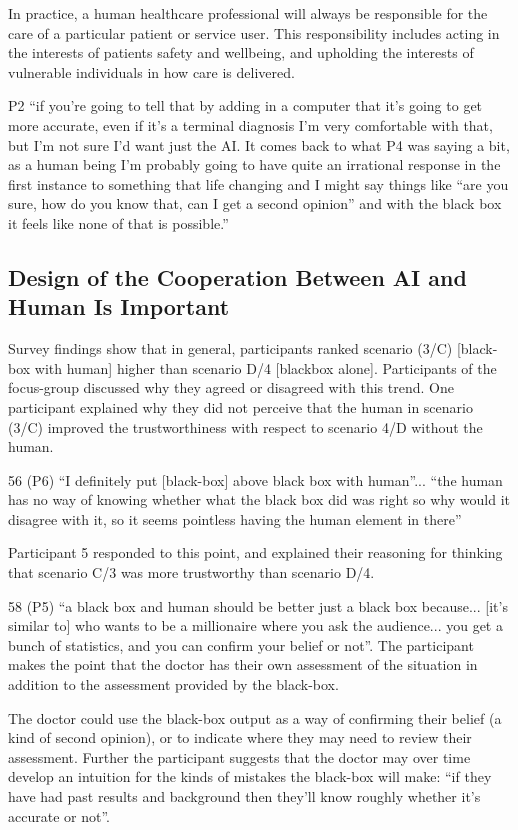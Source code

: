 \documentclass[manuscript,screen,review]{acmart}
\begin{document}
In practice, a human healthcare professional will always be responsible for the care of a particular patient or service user. This responsibility includes acting in the interests of patients safety and wellbeing, and upholding the interests of vulnerable individuals in how care is delivered. 

P2 “if you're going to tell that by adding in a computer that it’s going to get more accurate, even if it’s a terminal diagnosis I'm very comfortable with that, but I'm not sure I'd want just the AI. It comes back to what P4 was saying a bit, as a human being I'm probably going to have quite an irrational response in the first instance to something that life changing and I might say things like “are you sure, how do you know that, can I get a second opinion” and with the black box it feels like none of that is possible.”

\subsection{Design of the Cooperation Between AI and Human Is Important}
Survey findings show that in general, participants ranked scenario (3/C) [black-box with human] higher than scenario D/4 [blackbox alone]. 
Participants of the focus-group discussed why they agreed or disagreed with this trend. One participant explained why they did not perceive that the human in scenario (3/C) improved the trustworthiness with respect to scenario 4/D without the human. 

56 (P6) “I definitely put [black-box] above black box with human”... 
“the human has no way of knowing whether what the black box did was right so why would it disagree with it, so it seems pointless having the human element in there”

Participant 5 responded to this point, and explained their reasoning for thinking that scenario C/3 was more trustworthy than scenario D/4. 

58 (P5) “a black box and human should be better just a black box because... [it's similar to] who wants to be a millionaire where you ask the audience... you get a bunch of statistics, and you can confirm your belief or not”. 
The participant makes the point that the doctor has their own assessment of the situation in addition to the assessment provided by the black-box.

The doctor could use the black-box output as a way of confirming their belief (a kind of second opinion), or to indicate where they may need to review their assessment. Further the participant suggests that the doctor may over time develop an intuition for the kinds of mistakes the black-box will make:
“if they have had past results and background then they’ll know roughly whether it’s accurate or not”.
\end{document}
